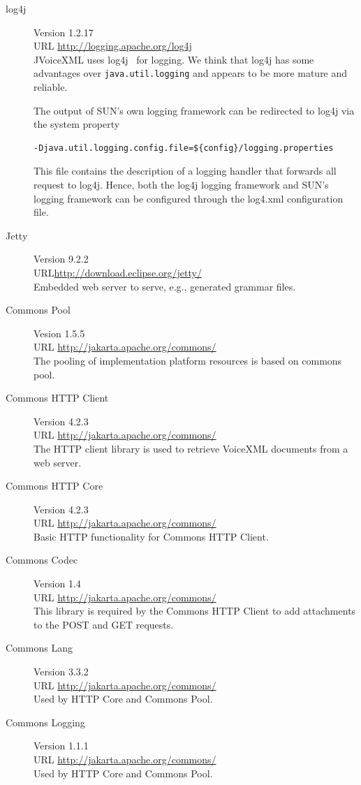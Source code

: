 \documentclass[11pt,a4paper]{article}
\begin{document}
\begin{description}
\item[log4j] Version 1.2.17 \\
URL \url{http://logging.apache.org/log4j} \\
JVoiceXML uses log4j~\cite{apache:log4j} for logging. We think that log4j has 
some advantages
over \texttt{java.util.logging} and appears to be more mature and reliable.

The output of SUN's own logging framework can be redirected to log4j via the
system property
\begin{lstlisting}
-Djava.util.logging.config.file=${config}/logging.properties
\end{lstlisting}

This file contains the description of a logging handler that forwards all
request to log4j. Hence, both the log4j logging framework and SUN's logging
framework can be configured through the log4.xml configuration file.
\item[Jetty] Version 9.2.2 \\
URL\url{http://download.eclipse.org/jetty/} \\
Embedded web server to serve, e.g., generated grammar files.
\item[Commons Pool] Vesion 1.5.5 \\
URL \url{http://jakarta.apache.org/commons/} \\
The pooling of implementation platform resources is based on commons
pool.
\item[Commons HTTP Client] Version 4.2.3 \\
URL \url{http://jakarta.apache.org/commons/} \\
The HTTP client library is used to retrieve VoiceXML documents from a web
server.
\item[Commons HTTP Core] Version 4.2.3 \\
URL \url{http://jakarta.apache.org/commons/} \\
Basic HTTP functionality for Commons HTTP Client.
\item[Commons Codec] Version 1.4 \\
URL \url{http://jakarta.apache.org/commons/} \\
This library is required by the Commons HTTP Client to add attachments to the
POST and GET requests.
\item[Commons Lang] Version 3.3.2 \\
URL \url{http://jakarta.apache.org/commons/} \\
Used by HTTP Core and Commons Pool.
\item[Commons Logging] Version 1.1.1 \\
URL \url{http://jakarta.apache.org/commons/} \\
Used by HTTP Core and Commons Pool.
\end{description}
\end{document}
